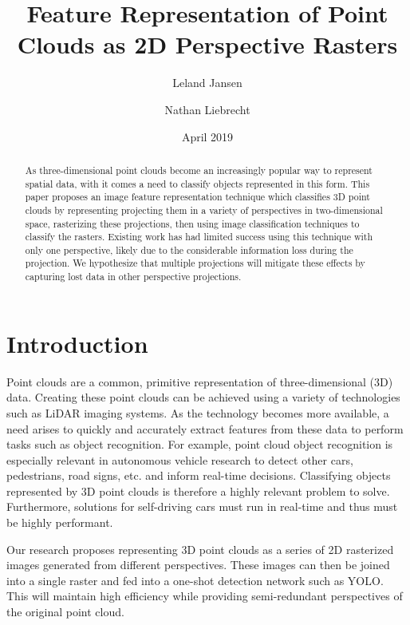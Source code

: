 \documentclass[runningheads,a4paper]{llncs}
\begin{document}
\title{Feature Representation of Point Clouds as 2D Perspective Rasters}
\author{Leland Jansen \and Nathan Liebrecht}
\date{April 2019}

\maketitle

\begin{abstract}
As three-dimensional point clouds become an increasingly popular way to
represent spatial data, with it comes a need to classify objects represented in
this form. This paper proposes an image feature representation technique which
classifies 3D point clouds by representing projecting them in a variety of
perspectives in two-dimensional space, rasterizing these projections, then using
image classification techniques to classify the rasters. Existing work has had
limited success using this technique with only one perspective, likely due to
the considerable information loss during the projection. We hypothesize that
multiple projections will mitigate these effects by capturing lost data in other
perspective projections.
\end{abstract}

\section{Introduction}
Point clouds are a common, primitive representation of three-dimensional (3D)
data. Creating these point clouds can be achieved using a variety of
technologies such as LiDAR imaging systems. As the technology becomes more
available, a need arises to quickly and accurately extract features from these
data to perform tasks such as object recognition. For example, point cloud
object recognition is especially relevant in autonomous vehicle research to
detect other cars, pedestrians, road signs, etc. and inform real-time decisions.
Classifying objects represented by 3D point clouds is therefore a highly
relevant problem to solve. Furthermore, solutions for self-driving cars must run
in real-time and thus must be highly performant.

Our research proposes representing 3D point clouds as a series of 2D rasterized
images generated from different perspectives. These images can then be joined
into a single raster and fed into a one-shot detection network such as YOLO.
This will maintain high efficiency while providing semi-redundant perspectives
of the original point cloud.
\end{document}

